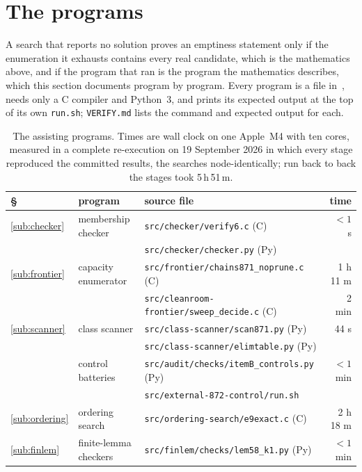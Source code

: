 \documentclass[10pt]{article}
\theoremstyle{remark}
\theoremstyle{plain}
\newcommand{\prog}[1]{\texttt{#1}}
\begin{document}
\section{The programs}\label{sec:programs}

A search that reports no solution proves an emptiness statement only
if the enumeration it exhausts contains every real candidate, which is
the mathematics above, and if the program that ran is the program the
mathematics describes, which this section documents program by
program.  Every program is a file in~\cite{REPO}, needs only a C
compiler and Python~3, and prints its expected output at the top of its
own \prog{run.sh}; \prog{VERIFY.md} lists the command and expected
output for each.

\begin{table}[H]\centering\footnotesize
\caption{The assisting programs.  Times are wall clock on one
Apple~M4 with ten cores, measured in a complete re-execution on 19
September 2026 in which every stage reproduced the committed results,
the searches node-identically; run back to back the stages took
5\,h\,51\,m.}
\label{tab:progs}\smallskip
\begin{tabular}{@{}lllr@{}}
\toprule
\S & program & source file & time\\
\midrule
\ref{sub:checker} & membership checker & \prog{src/\allowbreak checker/\allowbreak verify6.c} (C) & $<1$ s\\
 & & \prog{src/\allowbreak checker/\allowbreak checker.py} (Py) & \\
\ref{sub:frontier} & capacity enumerator & \prog{src/\allowbreak frontier/\allowbreak chains871\_noprune.c} (C) & 1 h 11 m\\
 & & \prog{src/\allowbreak cleanroom-frontier/\allowbreak sweep\_decide.c} (C) & 2 min\\
\ref{sub:scanner} & class scanner & \prog{src/\allowbreak class-scanner/\allowbreak scan871.py} (Py) & 44 s\\
 & & \prog{src/\allowbreak class-scanner/\allowbreak elimtable.py} (Py) & \\
 & control batteries & \prog{src/\allowbreak audit/\allowbreak checks/\allowbreak itemB\_controls.py} (Py) & $<1$ min\\
 & & \prog{src/\allowbreak external-872-control/\allowbreak run.sh} & \\
\ref{sub:ordering} & ordering search & \prog{src/\allowbreak ordering-search/\allowbreak e9exact.c} (C) & 2 h 18 m\\
\ref{sub:finlem} & finite-lemma checkers & \prog{src/\allowbreak finlem/\allowbreak checks/\allowbreak lem58\_k1.py} (Py) & $<1$ min\\

\end{tabular}
\end{table}
\end{document}
